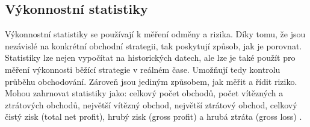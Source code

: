\subsection{Výkonnostní statistiky}
Výkonnostní statistiky se používají k měření odměny a rizika.
Díky tomu, že jsou nezávislé na konkrétní obchodní strategii, tak poskytují způsob, jak je porovnat.
Statistiky lze nejen vypočítat na historických datech, ale lze je také použít pro měření výkonnosti běžící strategie v reálném čase.
Umožňují tedy kontrolu průběhu obchodování.
Zároveň jsou jediným způsobem, jak měřit a řídit riziko.
Mohou zahrnovat statistiky jako: celkový počet obchodů, počet vítězných a ztrátových obchodů, největší vítězný obchod, největší ztrátový obchod, celkový čistý zisk (total net profit), hrubý zisk (gross profit) a hrubá ztráta (gross loss) \cite{pardo}.

